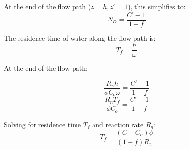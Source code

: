 \begin{tcolorbox}
{\begin{multicols}{2}
\end{multicols}

\bsk

\begin{multicols}{2} %
    
    At the end of the flow path (\(z = h, z' = 1\)), this simplifies to:
    \vspace{10mm}
    \columnbreak
    \begin{equation}
        N_D = \frac{C' - 1}{1-f}
    \end{equation}
    
\end{multicols}

\bsk

\begin{multicols}{2} %
    
    The residence time of water along the flow path is:
    \vspace{10mm}
    \columnbreak
    \begin{equation}
        T_f = \frac{h}{\omega}
    \end{equation}
    
\end{multicols}

\begin{multicols}{2} %
    
    At the end of the flow path:
    \vspace{10mm}


    \columnbreak
    \begin{equation}
        \frac{R_n h}{\phi C_o \omega} = \frac{C' - 1}{1-f}
    \end{equation}
    \begin{equation}
        \frac{R_n T_f}{\phi C_o} = \frac{C' - 1}{1-f}
    \end{equation}
    
\end{multicols}

\bsk

\begin{multicols}{2} %
    
    Solving for residence time \(T_f\) and reaction rate \(R_n\):
    \vspace{10mm}
    \columnbreak
    \begin{equation}
        T_f = \frac{(C - C_o)\phi}{(1-f)R_n}
    \end{equation}


\end{multicols}}
\end{tcolorbox}
